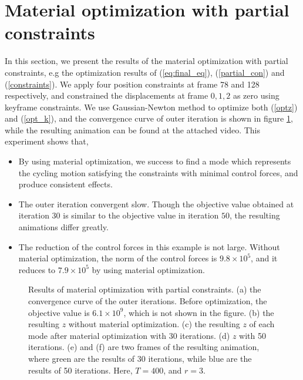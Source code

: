 \documentclass[9pt,twocolumn]{extarticle}
\begin{document}
\section{Material optimization with partial constraints}\label{sec:mater-optim-with}
In this section, we present the results of the material optimization with
partial constraints, e.g the optimization results of (\ref{eq:final_eq}),
(\ref{partial_con}) and (\ref{constraints}). We apply four position constraints
at frame 78 and 128 respectively, and constrained the displacements at frame
$0,1,2$ as zero using keyframe constraints. We use Gaussian-Newton method to
optimize both (\ref{optz}) and (\ref{opt_k}), and the convergence curve of outer
iteration is shown in figure \ref{f_rlst_parcon}, while the resulting animation
can be found at the attached video. This experiment shows that,
\begin{itemize}
\item By using material optimization, we success to find a mode which represents
  the cycling motion satisfying the constraints with minimal control forces, and
  produce consistent effects.
\item The outer iteration convergent slow. Though the objective value obtained
  at iteration 30 is similar to the objective value in iteration $50$, the
  resulting animations differ greatly.
\item The reduction of the control forces in this example is not large. Without
  material optimization, the norm of the control forces is $9.8\times 10^5$, and
  it reduces to $7.9\times 10^5$ by using material optimization.
\end{itemize}
\begin{figure}
  \centering
  \caption{Results of material optimization with partial constraints. (a) the
    convergence curve of the outer iterations. Before optimization, the
    objective value is $6.1\times 10^9$, which is not shown in the figure. (b)
    the resulting $z$ without material optimization. (c) the resulting $z$ of
    each mode after material optimization with 30 iterations. (d) $z$ with 50
    iterations. (e) and (f) are two frames of the resulting animation, where
    green are the results of 30 iterations, while blue are the results of 50
    iterations. Here, $T=400$, and $r=3$.}
  \label{f_rlst_parcon}
\end{figure}
\end{document}
